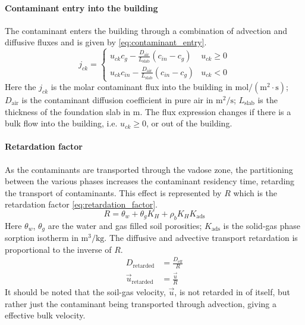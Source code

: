 \paragraph{Contaminant entry into the building}

The contaminant enters the building through a combination of advection and diffusive fluxes and is given by \eqref{eq:contaminant_entry}.
\begin{equation}\label{eq:contaminant_entry}
  j_{ck} = \begin{cases}
    u_{ck} c_g - \frac{D_\mathrm{air}}{L_\mathrm{slab}} (c_{in} - c_g) & u_{ck} \geq 0 \\
    u_{ck} c_{in} - \frac{D_\mathrm{air}}{L_\mathrm{slab}} (c_{in} - c_g) & u_{ck} < 0
\end{cases}
\end{equation}
Here the $j_{ck}$ is the molar contaminant flux into the building in $\mathrm{mol/(m^2 \cdot s)}$;
$D_\mathrm{air}$ is the contaminant diffusion coefficient in pure air in $\mathrm{m^2/s}$;
$L_\mathrm{slab}$ is the thickness of the foundation slab in $\mathrm{m}$.
The flux expression changes if there is a bulk flow into the building, i.e. $u_{ck} \geq 0$, or out of the building.

\paragraph{Retardation factor}

As the contaminants are transported through the vadose zone, the partitioning between the various phases increases the contaminant residency time, retarding the transport of contaminants.
This effect is represented by $R$ which is the retardation factor \eqref{eq:retardation_factor}.
\begin{equation}\label{eq:retardation_factor}
  R = \theta_w + \theta_g K_H + \rho_b K_H K_\mathrm{ads}
\end{equation}
Here $\theta_w$, $\theta_g$ are the water and gas filled soil porosities;
$K_\mathrm{ads}$ is the solid-gas phase sorption isotherm in $\mathrm{m^3/kg}$.
The diffusive and advective transport retardation is proportional to the inverse of $R$.
\begin{align}
  D_\mathrm{retarded} &= \frac{D_\mathrm{eff}}{R} \\
  \vec{u}_\mathrm{retarded} &= \frac{\vec{u}}{R}
\end{align}
It should be noted that the soil-gas velocity, $\vec{u}$, is not retarded in of itself, but rather just the contaminant being transported through advection, giving a effective bulk velocity.\par

